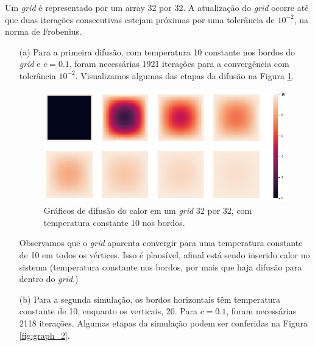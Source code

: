\documentclass{article}
\begin{document}
        Um \textit{grid} é representado por um array 32 por 32. A atualização do \textit{grid} ocorre até que 
        duas iterações consecutivas estejam próximas por uma tolerância de $10^{-2}$, na norma de Frobenius.

        \begin{itemize}
            \item[(a)] Para a primeira difusão, com temperatura 10 constante nos bordos do \textit{grid}
                e $c=0.1$, foram necessárias 1921 iterações para a convergência com tolerância $10^{-2}$. Visualizamos algumas das etapas da difusão na Figura \ref{fig:graph_1}.
                
                \begin{figure}[!h]
                    \includegraphics[width=\textwidth]{graph_1.png}
                    \caption{Gráficos de difusão do calor em um \textit{grid} 32 por 32, com temperatura constante 10 nos bordos.}
                    \label{fig:graph_1}
                \end{figure}

                Observamos que o \textit{grid} aparenta convergir para uma temperatura constante de 10 em todos os vértices.
                Isso é plausível, afinal está sendo inserido calor no sistema (temperatura constante nos bordos, por mais que haja difusão
                para dentro do \textit{grid}.)

            \item[(b)] Para a segunda simulação, os bordos horizontais têm temperatura constante de 10,
                enquanto os verticais, 20. Para $c=0.1$, foram necessárias 2118 iterações. Algumas etapas da simulação
                podem ser conferidas na Figura \ref{fig:graph_2}.
                

\end{itemize}
\end{document}

